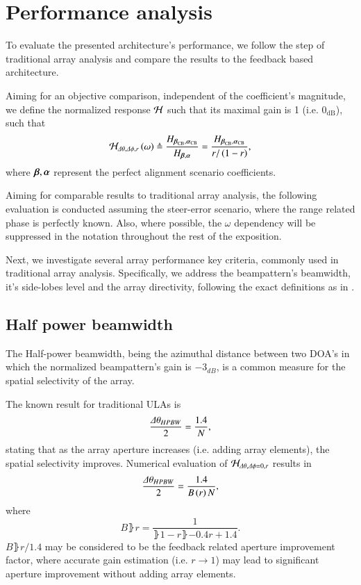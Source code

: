 \documentclass[conference]{IEEEtran}
\begin{document}
\section{Performance analysis}\label{sec_performance}
To evaluate the presented architecture's performance, we follow the step of traditional array analysis \cite{VanTrees2002DetectionIV} and compare the results to the feedback based architecture.
\par Aiming for an objective comparison, independent of the coefficient's magnitude, we define the normalized response $\mathcal{H}$ such that its maximal gain is 1 (i.e. $0_{\text{dB}}$), such that
\begin{equation}\label{eq_Hr}
    \Hr_{\dTheta,\dPhi,r}\rBrace{\omega}
    \triangleq
    \frac{
    H_{\vBeta_{\text{CB}},\vAlpha_{\text{CB}}}
    }{
    H_{\vBeta,\vAlpha}
    }
    =
    \frac{
    H_{\vBeta_{\text{CB}},\vAlpha_{\text{CB}}}
    }{
    r/\rBrace{1-r}
    },
\end{equation}
where $\boldsymbol{\beta},\boldsymbol{\alpha}$ represent the perfect alignment scenario coefficients.
\par Aiming for comparable results to traditional array analysis, the following evaluation is conducted assuming the steer-error scenario, where the range related phase is perfectly known. 
Also, where possible, the $\omega$ dependency will be suppressed in the notation throughout the rest of the exposition.
\par Next, we investigate several array performance key criteria, commonly used in traditional array analysis.
Specifically, we address the beampattern's beamwidth, it's side-lobes level and the array directivity, following the exact definitions as in \cite{VanTrees2002DetectionIV}.
\subsection*{Half power beamwidth}
The Half-power beamwidth, being the azimuthal distance between two DOA's in which the normalized beampattern's gain is $-3_{dB}$, is a common measure for the spatial selectivity of the array.
\par The known \cite{VanTrees2002DetectionIV} result for traditional ULAs is
\begin{equation}\label{eq_classicHPBW}
    \frac{\dTheta_{HPBW}}{2}=\frac{1.4}{N},
\end{equation}
stating that as the array aperture increases (i.e. adding array elements), the spatial selectivity improves.
Numerical evaluation of $\mathcal{H}_{\Delta\theta,\Delta\phi=0,r}$ results in
\begin{equation}\label{eq_fbHPBW}
    \frac{\dTheta_{HPBW}}{2}=\frac{1.4}{B\rBrace{r}N},
\end{equation}
where 
\begin{equation}\label{eq_fbHPBW_Br}
    B\rBrace{r}=\frac{1}{\rBrace{1-r}\rBrace{-0.4r+1.4}}.
\end{equation}
$B\rBrace{r}/1.4$ may be considered to be the feedback related aperture improvement factor, where accurate gain estimation (i.e. $r\to1$) may lead to significant aperture improvement without adding array elements.
\end{document}
